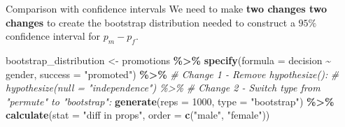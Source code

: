 \documentclass[
  ignorenonframetext,
]{beamer}
\newenvironment{Shaded}{\begin{snugshade}}{\end{snugshade}}
\newcommand{\AttributeTok}[1]{\textcolor[rgb]{0.13,0.29,0.53}{#1}}
\newcommand{\CommentTok}[1]{\textcolor[rgb]{0.56,0.35,0.01}{\textit{#1}}}
\newcommand{\DecValTok}[1]{\textcolor[rgb]{0.00,0.00,0.81}{#1}}
\newcommand{\FunctionTok}[1]{\textcolor[rgb]{0.13,0.29,0.53}{\textbf{#1}}}
\newcommand{\NormalTok}[1]{#1}
\newcommand{\OtherTok}[1]{\textcolor[rgb]{0.56,0.35,0.01}{#1}}
\newcommand{\SpecialCharTok}[1]{\textcolor[rgb]{0.81,0.36,0.00}{\textbf{#1}}}
\newcommand{\StringTok}[1]{\textcolor[rgb]{0.31,0.60,0.02}{#1}}
\begin{document}
\begin{frame}[fragile]{Comparison with confidence intervals}
\protect\hypertarget{comparison-with-confidence-intervals-1}{}
We need to make \textbf{two changes two changes} to create the bootstrap
distribution needed to construct a \(95\%\) confidence interval for
\(p_m-p_f\).

\begin{Shaded}
\begin{Highlighting}[]
\NormalTok{bootstrap\_distribution }\OtherTok{\textless{}{-}}\NormalTok{ promotions }\SpecialCharTok{\%\textgreater{}\%} 
  \FunctionTok{specify}\NormalTok{(}\AttributeTok{formula =}\NormalTok{ decision }\SpecialCharTok{\textasciitilde{}}\NormalTok{ gender, }
          \AttributeTok{success =} \StringTok{"promoted"}\NormalTok{) }\SpecialCharTok{\%\textgreater{}\%} 
  \CommentTok{\# Change 1 {-} Remove hypothesize():}
  \CommentTok{\# hypothesize(null = "independence") \%\textgreater{}\% }
  \CommentTok{\# Change 2 {-} Switch type from "permute" to "bootstrap":}
  \FunctionTok{generate}\NormalTok{(}\AttributeTok{reps =} \DecValTok{1000}\NormalTok{, }\AttributeTok{type =} \StringTok{"bootstrap"}\NormalTok{) }\SpecialCharTok{\%\textgreater{}\%} 
  \FunctionTok{calculate}\NormalTok{(}\AttributeTok{stat =} \StringTok{"diff in props"}\NormalTok{, }
            \AttributeTok{order =} \FunctionTok{c}\NormalTok{(}\StringTok{"male"}\NormalTok{, }\StringTok{"female"}\NormalTok{))}
\end{Highlighting}
\end{Shaded}
\end{frame}
\end{document}
